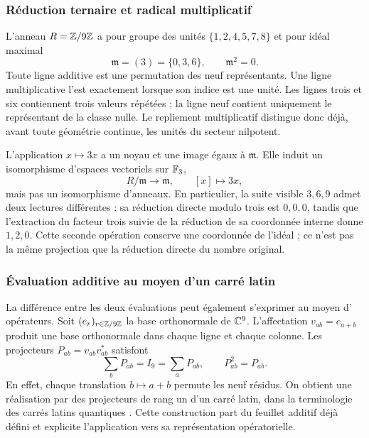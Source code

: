 \subsubsection{Réduction ternaire et radical multiplicatif}

L'anneau \(R=\mathbb Z/9\mathbb Z\) a pour groupe des unités \(\{1,2,4,5,7,8\}\) et pour idéal maximal
\[
 \mathfrak m=(3)=\{0,3,6\},\qquad\mathfrak m^2=0.
\]
Toute ligne additive est une permutation des neuf représentants. Une ligne multiplicative l'est exactement lorsque son indice est une unité. Les lignes trois et six contiennent trois valeurs répétées ; la ligne neuf contient uniquement le représentant de la classe nulle. Le repliement multiplicatif distingue donc déjà, avant toute géométrie continue, les unités du secteur nilpotent.

L'application \(x\mapsto3x\) a un noyau et une image égaux à \(\mathfrak m\). Elle induit un isomorphisme d'espaces vectoriels sur \(\mathbb F_3\),
\[
 R/\mathfrak m\longrightarrow\mathfrak m,\qquad [x]\longmapsto3x,
\]
mais pas un isomorphisme d'anneaux. En particulier, la suite visible \(3,6,9\) admet deux lectures différentes : sa réduction directe modulo trois est \(0,0,0\), tandis que l'extraction du facteur trois suivie de la réduction de sa coordonnée interne donne \(1,2,0\). Cette seconde opération conserve une coordonnée de l'idéal ; ce n'est pas la même projection que la réduction directe du nombre original.

\subsubsection{Évaluation additive au moyen d’un carré latin}

La différence entre les deux évaluations peut également s'exprimer au moyen d'
opérateurs. Soit \((e_r)_{r\in\mathbb Z/9\mathbb Z}\) la base orthonormale de \(\mathbb C^9\).
L'affectation \(v_{ab}=e_{a+b}\) produit une base orthonormale dans chaque ligne
et chaque colonne. Les projecteurs \(P_{ab}=v_{ab}v_{ab}^{*}\) satisfont
\[
 \sum_bP_{ab}=I_9=\sum_aP_{ab},\qquad P_{ab}^2=P_{ab}.
\]
En effet, chaque translation \(b\mapsto a+b\) permute les neuf résidus. On obtient une réalisation par des projecteurs de rang un d'un carré latin, dans la terminologie des carrés latins quantiques \cite{mustovicary,delascuevas2023}. Cette construction part du feuillet additif déjà défini et explicite l'application vers sa représentation opératorielle.

